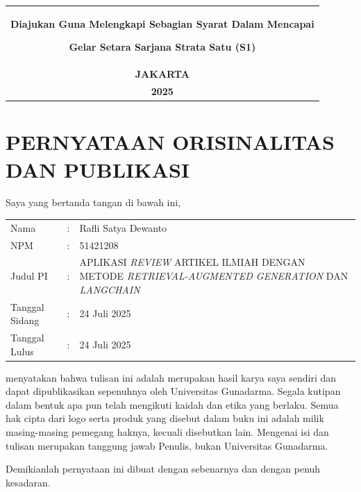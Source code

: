 \documentclass[12pt,oneside,bahasa]{book}
\makeatletter
\providecommand{\tabularnewline}{\\}
\newenvironment{cellvarwidth}[1][t]
    {\begin{varwidth}[#1]{\linewidth}}
    {\@finalstrut\@arstrutbox\end{varwidth}}
\newcommand{\Judul}{Aplikasi \textit {Review} Artikel Ilmiah dengan metode \textit {Retrieval-Augmented Generation} Dan \textit {Langchain} }
\newcommand{\Penulis}{Rafli Satya Dewanto}
\newcommand{\NPM}{51421208}
\newcommand{\Tahun}{2025}
\newcommand{\Kota}{JAKARTA}
\newcommand{\TanggalSidang}{24 Juli 2025}
\newcommand{\TanggalLulus}{24 Juli 2025}
\makeatother
\begin{document}
 \vspace{7mm}

\begin{center}
\begin{tabular}{c}
\begin{cellvarwidth}[t]
\centering
\textbf{Diajukan Guna Melengkapi Sebagian Syarat Dalam Mencapai }

\textbf{Gelar Setara Sarjana Strata Satu (S1)}
\end{cellvarwidth}\tabularnewline
\textbf{\Kota}\tabularnewline
\textbf{\Tahun}\tabularnewline
\end{tabular}
\par\end{center}

\chapter*{{\huge PERNYATAAN ORISINALITAS DAN PUBLIKASI}}

\begin{singlespace}
\thispagestyle{romanstyle}

Saya yang bertanda tangan di bawah ini,

\vspace*{10mm}

\hspace{-6pt}%
\begin{tabular}{>{\raggedright}p{30mm}c>{\raggedright}p{}}
Nama & : & \Penulis\tabularnewline
NPM & : & \NPM\tabularnewline
Judul PI & : & \MakeUppercase{\Judul}\tabularnewline
Tanggal Sidang & : & \TanggalSidang\tabularnewline
Tanggal Lulus & : & \TanggalLulus\tabularnewline
\end{tabular}

\vspace*{10mm}

\noindent menyatakan bahwa tulisan ini adalah merupakan hasil karya
saya sendiri dan dapat dipublikasikan sepenuhnya oleh Universitas
Gunadarma. Segala kutipan dalam bentuk apa pun telah mengikuti kaidah
dan etika yang berlaku. Semua hak cipta dari logo serta produk yang
disebut dalam buku ini adalah milik masing-masing pemegang haknya,
kecuali disebutkan lain. Mengenai isi dan tulisan merupakan tanggung
jawab Penulis, bukan Universitas Gunadarma.

Demikianlah pernyataan ini dibuat dengan sebenarnya dan dengan penuh
kesadaran.

\vspace*{15mm}
\end{singlespace}
\end{document}
